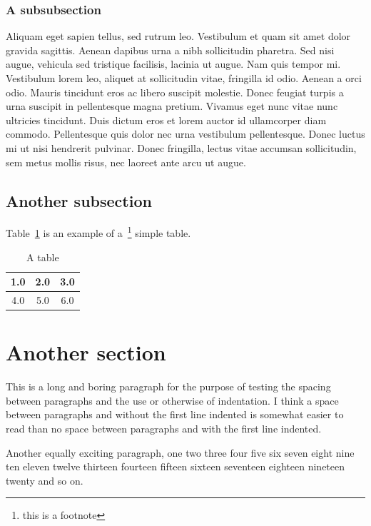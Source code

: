 \subsubsection{A subsubsection}

Aliquam eget sapien tellus, sed rutrum leo. Vestibulum et quam sit amet dolor gravida sagittis. Aenean dapibus urna a nibh sollicitudin pharetra. Sed nisi augue, vehicula sed tristique facilisis, lacinia ut augue. Nam quis tempor mi. Vestibulum lorem leo, aliquet at sollicitudin vitae, fringilla id odio. Aenean a orci odio. Mauris tincidunt eros ac libero suscipit molestie. Donec feugiat turpis a urna suscipit in pellentesque magna pretium. Vivamus eget nunc vitae nunc ultricies tincidunt. Duis dictum eros et lorem auctor id ullamcorper diam commodo. Pellentesque quis dolor nec urna vestibulum pellentesque. Donec luctus mi ut nisi hendrerit pulvinar. Donec fringilla, lectus vitae accumsan sollicitudin, sem metus mollis risus, nec laoreet ante arcu ut augue.

\subsection{Another subsection}

Table~\ref{tab:atable} is an example of a~\footnote{this is a
footnote} simple table.

\begin{table}[htb]
\begin{center}
\begin{tabular}{|c|c|c|}
\hline
1.0 & 2.0 & 3.0 \\
\hline
4.0 & 5.0 & 6.0 \\
\hline
\end{tabular}
\caption{A table}
\label{tab:atable}
\end{center}
\end{table}


\section{Another section}

This is a long and boring paragraph for the purpose of testing the
spacing between paragraphs and the use or otherwise of indentation. I
think a space between paragraphs and without the first line indented
is somewhat easier to read than no space between paragraphs and with
the first line indented.

Another equally exciting paragraph, one two three four five six seven
eight nine ten eleven twelve thirteen fourteen fifteen sixteen
seventeen eighteen nineteen twenty and so on.

